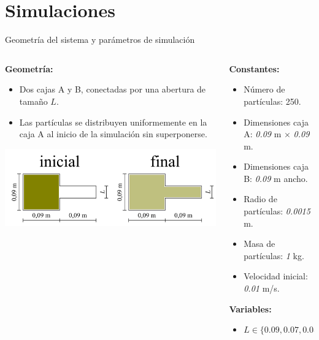 \documentclass{beamer}
\begin{document}
\section{Simulaciones}
\begin{frame}{Geometría del sistema y parámetros de simulación}
  \scriptsize
  \begin{columns}
    \begin{column}{0.5\textwidth}
      \textbf{Geometría:}
      \begin{itemize}
        \item Dos cajas A y B, conectadas por una abertura de tamaño $L$.
        \item Las partículas se distribuyen uniformemente en la caja A al inicio de la simulación sin superponerse.
      \end{itemize}
      \vspace{0.2cm}
      \begin{center}
        \includegraphics[width=0.85\linewidth]{photoMaterial/geometria.jpg}
      \end{center}
    \end{column}
    \begin{column}{0.5\textwidth}
      \textbf{Constantes:}
      \begin{itemize}
        \item Número de partículas: 250.
        \item Dimensiones caja A: \textit{0.09} m $\times$ \textit{0.09} m.
        \item Dimensiones caja B: \textit{0.09} m ancho.
        \item Radio de partículas: \textit{0.0015} m.
        \item Masa de partículas: \textit{1} kg.
        \item Velocidad inicial: \textit{0.01} m/s.
      \end{itemize}
      \vspace{0.2cm}
      \textbf{Variables:}
      \begin{itemize}
        \item $L \in \{ \textit{0.09}, \textit{0.07}, \textit{0.05}, \textit{0.03} \}$
      \end{itemize}
    \end{column}
  \end{columns}
\end{frame}
\end{document}
